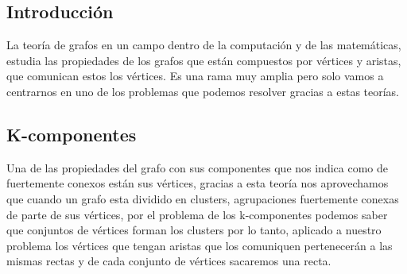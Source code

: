\subsection{Introducción}
La teoría de grafos\cite{Wiki:Grafos} en un campo dentro de la computación y de las matemáticas, estudia las propiedades de los grafos que están compuestos por vértices y aristas, que comunican estos los vértices.
Es una rama muy amplia pero solo vamos a centrarnos en uno de los problemas que podemos resolver gracias a estas teorías.

\subsection{K-componentes}
Una de las propiedades del grafo con sus componentes que nos indica como de fuertemente conexos están sus vértices, gracias a esta teoría nos aprovechamos que cuando un grafo esta dividido en clusters, agrupaciones fuertemente conexas de parte de sus vértices, por el problema de los k-componentes podemos saber que conjuntos de vértices forman los clusters por lo tanto, aplicado a nuestro problema los vértices que tengan aristas que los comuniquen pertenecerán a las mismas rectas y de cada conjunto de vértices sacaremos una recta.